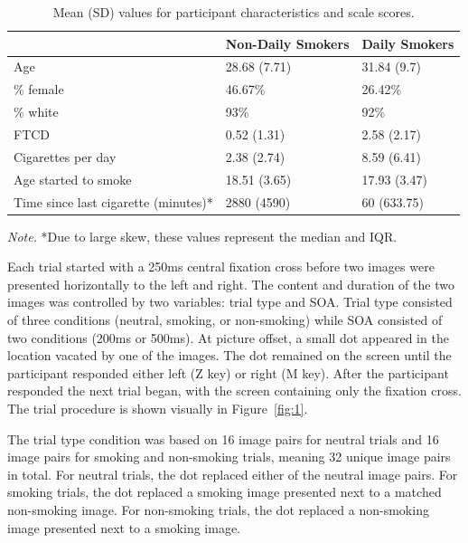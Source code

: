 \documentclass[empirical, authordate]{jote-new-article}
\begin{document}
\begin{table}[h!]


  \begin{fullwidth}
    \caption{Mean (SD) values for participant characteristics and scale scores.}
    \label{tab:1}
    \begin{tabularx}{\linewidth}{@{}>{\RaggedRight\arraybackslash}X  l  l@{}}

      \toprule
                                           & {Non-Daily Smokers} & {Daily Smokers} \\ \midrule
      Age                                  & 28.68 (7.71)        & 31.84 (9.7)     \\
      \% female                            & 46.67{\%}           & 26.42{\%}       \\
      \% white                             & 93{\%}              & 92{\%}          \\
      FTCD                                 & 0.52 (1.31)         & 2.58 (2.17)     \\
      Cigarettes per day                   & 2.38 (2.74)         & 8.59 (6.41)     \\
      Age started to smoke                 & 18.51 (3.65)        & 17.93 (3.47)    \\
      Time since last cigarette (minutes)* & 2880 (4590)         & 60 (633.75)     \\ \bottomrule
    \end{tabularx}


    \small
    \emph{Note.} *Due to large skew, these values represent the median and IQR.
  \end{fullwidth}
\end{table}
Each trial started with a 250ms central fixation cross before two images were presented horizontally to the left and right. The content and duration of the two images was controlled by two variables: trial type and SOA. Trial type consisted of three conditions (neutral, smoking, or non-smoking) while SOA consisted of two conditions (200ms or 500ms). At picture offset, a small dot appeared in the location vacated by one of the images. The dot remained on the screen until the participant responded either left (Z key) or right (M key). After the participant responded the next trial began, with the screen containing only the fixation cross. The trial procedure is shown visually in Figure~\ref{fig:1}.

The trial type condition was based on 16 image pairs for neutral trials and 16 image pairs for smoking and non-smoking trials, meaning 32 unique image pairs in total. For neutral trials, the dot replaced either of the neutral image pairs. For smoking trials, the dot replaced a smoking image presented next to a matched non-smoking image. For non-smoking trials, the dot replaced a non-smoking image presented next to a smoking image.
\end{document}
